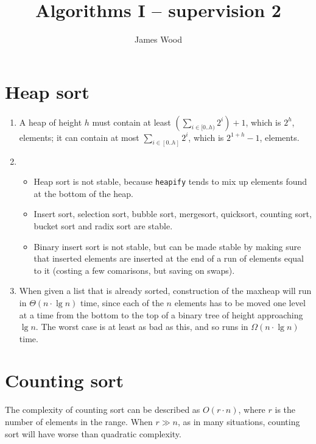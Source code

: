 \documentclass[11pt]{article}
\title{\textbf{Algorithms I -- supervision 2}}
\author{James Wood}
\begin{document}
\maketitle

\section{Heap sort}
\begin{enumerate}
\item A heap of height \(h\) must contain at least \(\left(\sum_{i\in[0..h)}2^i\right)+1\), which is \(2^h\), elements; it can contain at most \(\sum_{i\in[0..h]}2^i\), which is \(2^{1+h}-1\), elements.
\item
  \begin{itemize}
  \item Heap sort is not stable, because \texttt{heapify} tends to mix up elements found at the bottom of the heap.
  \item Insert sort, selection sort, bubble sort, mergesort, quicksort, counting sort, bucket sort and radix sort are stable.
  \item Binary insert sort is not stable, but can be made stable by making sure that inserted elements are inserted at the end of a run of elements equal to it (costing a few comarisons, but saving on swaps).
  \end{itemize}
\item When given a list that is already sorted, construction of the maxheap will run in \(\Theta(n\cdot\lg n)\) time, since each of the \(n\) elements has to be moved one level at a time from the bottom to the top of a binary tree of height approaching \(\lg n\). The worst case is at least as bad as this, and so runs in \(\Omega(n\cdot\lg n)\) time.
\end{enumerate}

\section{Counting sort}
The complexity of counting sort can be described as \(O(r\cdot n)\), where \(r\) is the number of elements in the range. When \(r\gg n\), as in many situations, counting sort will have worse than quadratic complexity.
\end{document}
